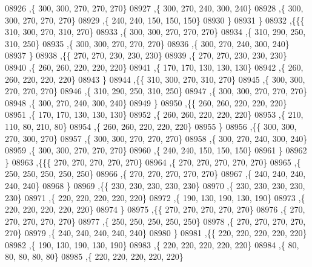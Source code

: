 \begin{DoxyCode}
08926     ,\{   300,   300,   270,   270,   270\}
08927     ,\{   300,   270,   240,   300,   240\}
08928     ,\{   300,   300,   270,   270,   270\}
08929     ,\{   240,   240,   150,   150,   150\}
08930     \}
08931    \}
08932   ,\{\{\{   310,   300,   270,   310,   270\}
08933     ,\{   300,   300,   270,   270,   270\}
08934     ,\{   310,   290,   250,   310,   250\}
08935     ,\{   300,   300,   270,   270,   270\}
08936     ,\{   300,   270,   240,   300,   240\}
08937     \}
08938    ,\{\{   270,   270,   230,   230,   230\}
08939     ,\{   270,   270,   230,   230,   230\}
08940     ,\{   260,   260,   220,   220,   220\}
08941     ,\{   170,   170,   130,   130,   130\}
08942     ,\{   260,   260,   220,   220,   220\}
08943     \}
08944    ,\{\{   310,   300,   270,   310,   270\}
08945     ,\{   300,   300,   270,   270,   270\}
08946     ,\{   310,   290,   250,   310,   250\}
08947     ,\{   300,   300,   270,   270,   270\}
08948     ,\{   300,   270,   240,   300,   240\}
08949     \}
08950    ,\{\{   260,   260,   220,   220,   220\}
08951     ,\{   170,   170,   130,   130,   130\}
08952     ,\{   260,   260,   220,   220,   220\}
08953     ,\{   210,   110,    80,   210,    80\}
08954     ,\{   260,   260,   220,   220,   220\}
08955     \}
08956    ,\{\{   300,   300,   270,   300,   270\}
08957     ,\{   300,   300,   270,   270,   270\}
08958     ,\{   300,   270,   240,   300,   240\}
08959     ,\{   300,   300,   270,   270,   270\}
08960     ,\{   240,   240,   150,   150,   150\}
08961     \}
08962    \}
08963   ,\{\{\{   270,   270,   270,   270,   270\}
08964     ,\{   270,   270,   270,   270,   270\}
08965     ,\{   250,   250,   250,   250,   250\}
08966     ,\{   270,   270,   270,   270,   270\}
08967     ,\{   240,   240,   240,   240,   240\}
08968     \}
08969    ,\{\{   230,   230,   230,   230,   230\}
08970     ,\{   230,   230,   230,   230,   230\}
08971     ,\{   220,   220,   220,   220,   220\}
08972     ,\{   190,   130,   190,   130,   190\}
08973     ,\{   220,   220,   220,   220,   220\}
08974     \}
08975    ,\{\{   270,   270,   270,   270,   270\}
08976     ,\{   270,   270,   270,   270,   270\}
08977     ,\{   250,   250,   250,   250,   250\}
08978     ,\{   270,   270,   270,   270,   270\}
08979     ,\{   240,   240,   240,   240,   240\}
08980     \}
08981    ,\{\{   220,   220,   220,   220,   220\}
08982     ,\{   190,   130,   190,   130,   190\}
08983     ,\{   220,   220,   220,   220,   220\}
08984     ,\{    80,    80,    80,    80,    80\}
08985     ,\{   220,   220,   220,   220,   220\}

\end{DoxyCode}
